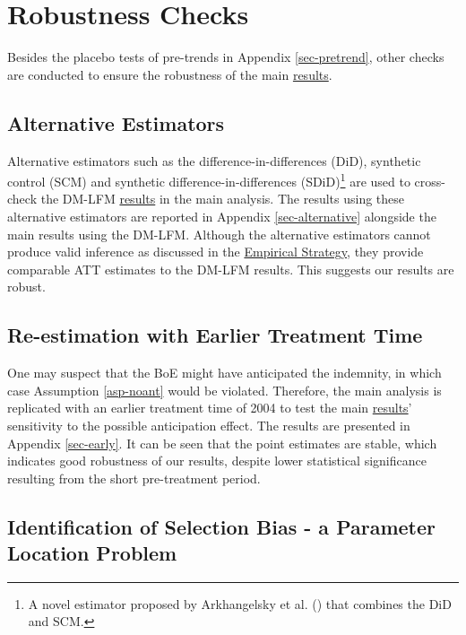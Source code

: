 \documentclass[
  a4paper,
  abstract=true]{scrartcl}
\theoremstyle{definition}
\begin{document}
\section{Robustness Checks}\label{sec-robustness}

Besides the placebo tests of pre-trends in Appendix \ref{sec-pretrend},
other checks are conducted to ensure the robustness of the main
\hyperref[sec-results]{results}.

\subsection{Alternative Estimators}\label{alternative-estimators}

Alternative estimators such as the difference-in-differences (DiD),
synthetic control (SCM) and synthetic difference-in-differences
(SDiD)\footnote{A novel estimator proposed by Arkhangelsky et al.
  () that combines the DiD and SCM.}
are used to cross-check the DM-LFM \hyperref[sec-results]{results} in
the main analysis. The results using these alternative estimators are
reported in Appendix \ref{sec-alternative} alongside the main results
using the DM-LFM. Although the alternative estimators cannot produce
valid inference as discussed in the \hyperref[sec-empirical]{Empirical
Strategy}, they provide comparable ATT estimates to the DM-LFM results.
This suggests our results are robust.

\subsection{Re-estimation with Earlier Treatment
Time}\label{sec-main-early}

One may suspect that the BoE might have anticipated the indemnity, in
which case Assumption \ref{asp-noant} would be violated. Therefore, the
main analysis is replicated with an earlier treatment time of 2004 to
test the main \hyperref[sec-results]{results}' sensitivity to the
possible anticipation effect. The results are presented in Appendix
\ref{sec-early}. It can be seen that the point estimates are stable,
which indicates good robustness of our results, despite lower
statistical significance resulting from the short pre-treatment period.

\subsection{Identification of Selection Bias - a Parameter Location
Problem}\label{sec-bias}
\end{document}
